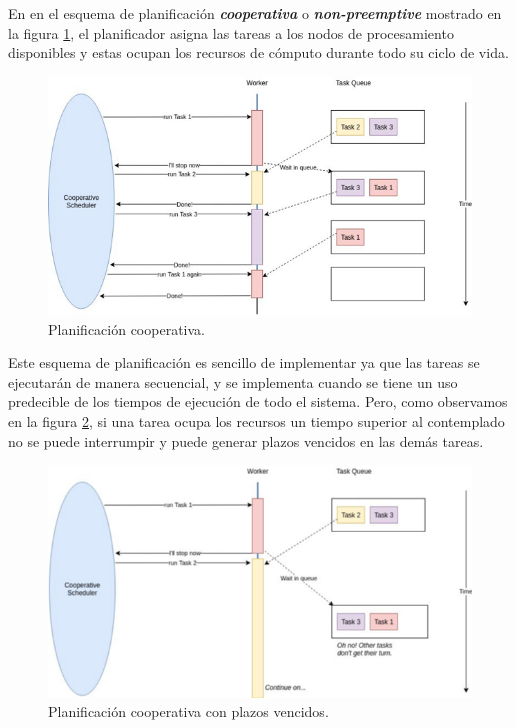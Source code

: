 En en el esquema de planificación \textit{\textbf{cooperativa}} o \textit{\textbf{non-preemptive}} mostrado en la figura \ref{fig:schedcoo}, el planificador asigna las tareas a los nodos de procesamiento disponibles y estas ocupan los recursos de cómputo durante todo su ciclo de vida.

  \begin{figure}[ht]
      \centering
        \includegraphics[scale=1]{img/schedCoo}
        \caption{Planificación cooperativa.\cite{medium}}
        \label{fig:schedcoo}
    \end{figure}
    
Este esquema de planificación es sencillo de implementar ya que las tareas se ejecutarán de manera secuencial, y se implementa cuando se tiene un uso predecible de los tiempos de ejecución de todo el sistema. Pero, como observamos en la figura \ref{fig:schedcoodead}, si una tarea ocupa los recursos un tiempo superior al contemplado no se puede interrumpir y puede generar plazos vencidos en las demás tareas.

  \begin{figure}[ht]
      \centering
        \includegraphics[scale=1]{img/schedCooDead}
        \caption{Planificación cooperativa con plazos vencidos.\cite{medium}}
        \label{fig:schedcoodead}
    \end{figure}
    
